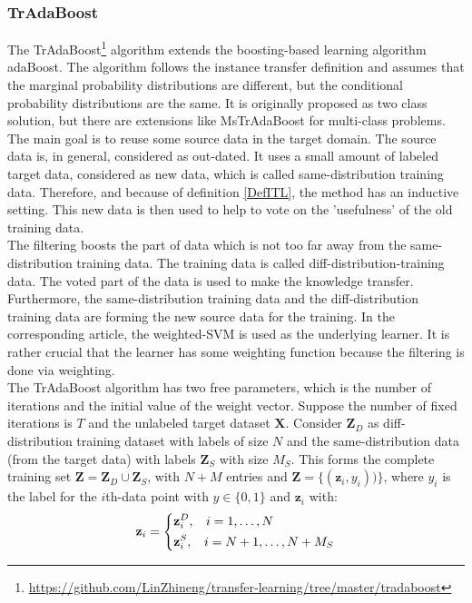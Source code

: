 \subsubsection{TrAdaBoost}
The TrAdaBoost\footnote{\url{https://github.com/LinZhineng/transfer-learning/tree/master/tradaboost}} algorithm extends the boosting-based learning algorithm adaBoost.
The algorithm follows the instance transfer definition and assumes that the marginal probability distributions are different, but the conditional probability distributions are the same.\cite{Dai.}
It is originally proposed as two class solution, but there are extensions like MsTrAdaBoost for multi-class problems.\cite{Huang.2012}\\
The main goal is to reuse some source data in the target domain.
The source data is, in general, considered as out-dated.
It uses a small amount of labeled target data, considered as new data, which is called same-distribution training data.
Therefore, and because of definition \ref{DefITL}, the method has an inductive setting.
This new data is then used to help to vote on the 'usefulness' of the old training data.\cite{Dai.}\\
The filtering boosts the part of data which is not too far away from the same-distribution training data.
The training data is called diff-distribution-training data.
The voted part of the data is used to make the knowledge transfer.
Furthermore, the same-distribution training data and the diff-distribution training data are forming the new source data for the training.
In the corresponding article, the weighted-\acs{SVM} is used as the underlying learner.
It is rather crucial that the learner has some weighting function because the filtering is done via weighting.\cite{Dai.}\\
The TrAdaBoost algorithm has two free parameters, which is the number of iterations and the initial value of the weight vector.
Suppose the number of fixed iterations is $T$ and the unlabeled target dataset $\mathbf{X}$.
Consider $\mathbf{Z}_D$ as diff-distribution training dataset with labels of size $N$ and the same-distribution data (from the target data) with labels $\mathbf{Z}_S$ with size $M_S$.
This forms the complete training set $\mathbf{Z}=\mathbf{Z}_D\cup \mathbf{Z}_S$, with $N+M$ entries and $\mathbf{\mathbf{Z}}=\{(\mathbf{z}_i,y_i))\}$, where $y_i$ is the label for the $i$th-data point with $y\in \{0,1\}$ and $\mathbf{z}_i$ with:\cite{Dai.}
\begin{equation*}
	\mathbf{z}_i = \begin{dcases}
						\mathbf{z}_i^D, \>\>\>\> i = 1,\dots,N\\
						\mathbf{z}_i^S, \>\>\>\> i = N +1,\dots,N+M_S
			  	   \end{dcases}
\end{equation*}
